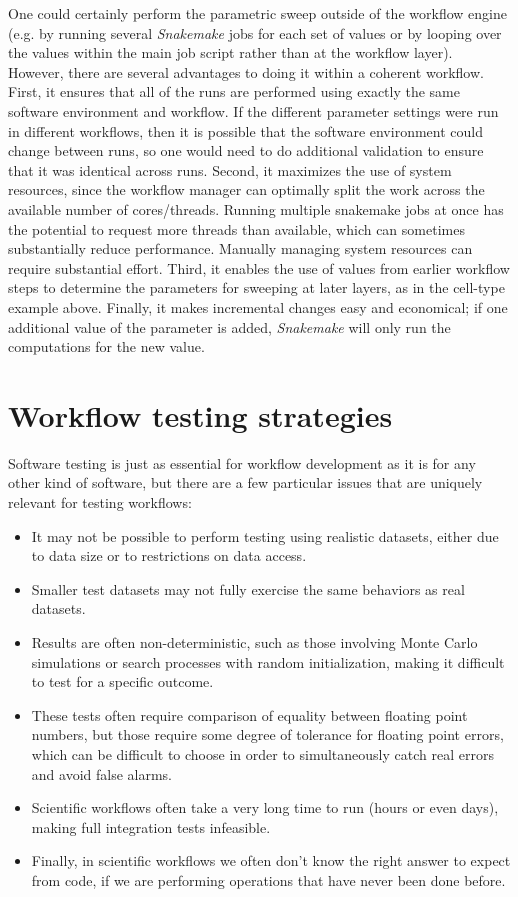 One could certainly perform the parametric sweep outside of the workflow engine (e.g. by running several \textit{Snakemake} jobs for each set of values or by looping over the values within the main job script rather than at the workflow layer). However, there are several advantages to doing it within a coherent workflow. First, it ensures that all of the runs are performed using exactly the same software environment and workflow.  If the different parameter settings were run in different workflows, then it is possible that the software environment could change between runs, so one would need to do additional validation to ensure that it was identical across runs.  Second, it maximizes the use of system resources, since the workflow manager can optimally split the work across the available number of cores/threads.  Running multiple snakemake jobs at once has the potential to request more threads than available, which can sometimes substantially reduce performance.  Manually managing system resources can require substantial effort.  Third, it enables the use of values from earlier workflow steps to determine the parameters for sweeping at later layers, as in the cell-type example above.  Finally, it makes incremental changes easy and economical; if one additional value of the parameter is added, \textit{Snakemake} will only run the computations for the new value.

\section{Workflow testing strategies}

Software testing is just as essential for workflow development as it is for any other kind of software, but there are a few particular issues that are uniquely relevant for testing workflows:

\begin{itemize}
\item It may not be possible to perform testing using realistic datasets, either due to data size or to restrictions on data access.
\item Smaller test datasets may not fully exercise the same behaviors as real datasets.
\item Results are often non-deterministic, such as those involving Monte Carlo simulations or search processes with random initialization, making it difficult to test for a specific outcome.
\item These tests often require comparison of equality between floating point numbers, but those require some degree of tolerance for floating point errors, which can be difficult to choose in order to simultaneously catch real errors and avoid false alarms.
\item Scientific workflows often take a very long time to run (hours or even days), making full integration tests infeasible.
\item Finally, in scientific workflows we often don't know the right answer to expect from code, if we are performing operations that have never been done before.
\end{itemize}

